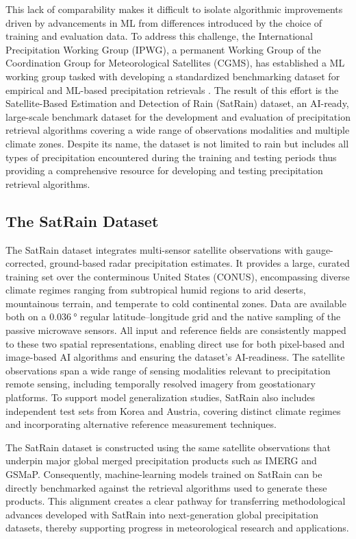 \documentclass[11pt]{article}
\begin{document}
This lack of comparability makes it difficult to isolate algorithmic
improvements driven by advancements in ML from differences
introduced by the choice of training and evaluation data. To address this
challenge, the International Precipitation Working Group (IPWG), a permanent
Working Group of the Coordination Group for Meteorological Satellites (CGMS),
has established a ML working group tasked with developing a
standardized benchmarking dataset for empirical and ML-based
precipitation retrievals \citep{Kubota2025IPWG}. The result of this effort is
the Satellite-Based Estimation and Detection of Rain (SatRain) dataset, an
AI-ready, large-scale benchmark dataset for the development and evaluation of
precipitation retrieval algorithms covering a wide range of observations
modalities and multiple climate zones. Despite its name, the dataset is not
limited to rain but includes all types of precipitation encountered during the
training and testing periods thus providing a comprehensive resource for
developing and testing precipitation retrieval algorithms.


\subsection{The SatRain Dataset}

The SatRain dataset integrates multi-sensor satellite observations with
gauge-corrected, ground-based radar precipitation estimates. It provides a
large, curated training set over the conterminous United States (CONUS),
encompassing diverse climate regimes ranging from subtropical humid regions to
arid deserts, mountainous terrain, and temperate to cold continental zones. Data
are available both on a $\SI{0.036}{\degree}$ regular latitude–longitude grid
and the native sampling of the passive microwave sensors. All input and
reference fields are consistently mapped to these two spatial representations,
enabling direct use for both pixel-based and image-based AI algorithms and
ensuring the dataset’s AI-readiness. The satellite observations span a wide
range of sensing modalities relevant to precipitation remote sensing, including
temporally resolved imagery from geostationary platforms. To support model
generalization studies, SatRain also includes independent test sets from Korea
and Austria, covering distinct climate regimes and incorporating alternative
reference measurement techniques.

The SatRain dataset is constructed using the same satellite observations that
underpin major global merged precipitation products such as IMERG and GSMaP.
Consequently, machine-learning models trained on SatRain can be directly
benchmarked against the retrieval algorithms used to generate these products.
This alignment creates a clear pathway for transferring methodological advances
developed with SatRain into next-generation global precipitation datasets,
thereby supporting progress in meteorological research and applications.
\end{document}
